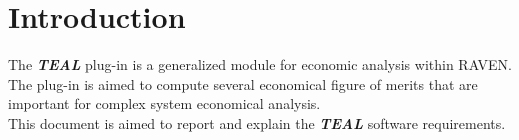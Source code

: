 \section{Introduction}
The \textbf{\textit{TEAL}} plug-in is a generalized module for economic analysis within RAVEN.
\\The plug-in is aimed to compute several economical figure of merits that are important for complex
system economical analysis.
\\This document is aimed to report and explain the  \textbf{\textit{TEAL}} software requirements.
